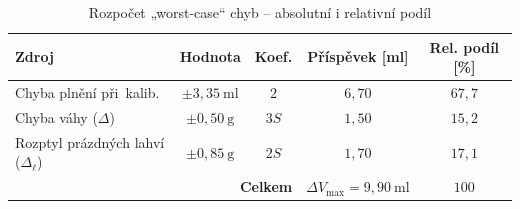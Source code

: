 %
%



\begin{table}[h]
\centering
\caption{Rozpočet „worst-case“ chyb – absolutní i relativní podíl}
\renewcommand{\arraystretch}{1.15}
\begin{tabular}{@{}lcccc@{}}
\toprule
\textbf{Zdroj} & \textbf{Hodnota} & \textbf{Koef.} & \textbf{Příspěvek [ml]} & \textbf{Rel. podíl [\%]}\\
\midrule
Chyba plnění při~kalib.        & $\pm3{,}35\ \mathrm{ml}$ & $2$ & $6{,}70$ & $67{,}7$\\
Chyba váhy (\(\Delta\))        & $\pm0{,}50\ \mathrm{g}$ & $3S$ & $1{,}50$ & $15{,}2$\\
Rozptyl prázdných lahví (\(\Delta_\ell\))
                               & $\pm0{,}85\ \mathrm{g}$ & $2S$ & $1{,}70$ & $17{,}1$\\
\midrule
\multicolumn{3}{r}{\textbf{Celkem}} &
\(\boxed{\Delta V_{\text{max}} = 9{,}90\ \mathrm{ml}}\) & $100$\\
\bottomrule
\end{tabular}
\label{tab:worst_case_budget_rel}
\end{table}


